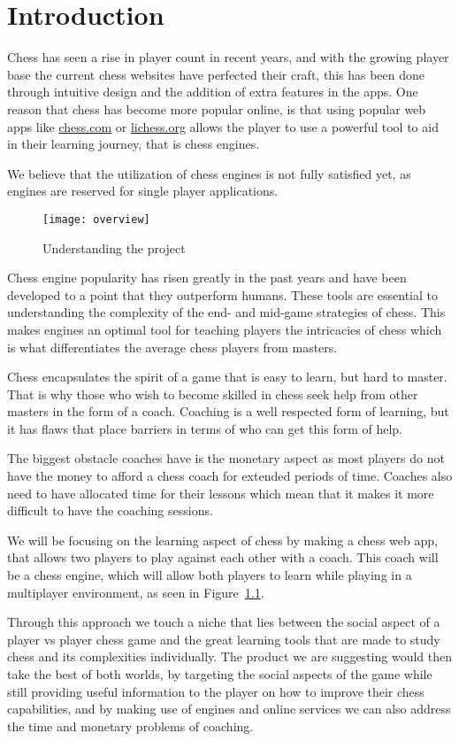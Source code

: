 \chapter{Introduction}\label{ch:introduction}

Chess has seen a rise in player count in recent years, and with the growing player base the current chess websites have
perfected their craft, this has been done through intuitive design and the addition of extra features in the apps.
One reason that chess has become more popular online, is that using popular web apps like \url{chess.com} or
\url{lichess.org} allows the player to use a powerful tool to aid in their learning journey, that is chess engines.

We believe that the utilization of chess engines is not fully satisfied yet, as engines are reserved for single player
applications.

\begin{figure}[htb]
    \centering
    \texttt{[image: overview]}
    \caption{Understanding the project}\label{fig:project-overview}
\end{figure}

Chess engine popularity has risen greatly in the past years and have been developed to a point that they
outperform humans.
These tools are essential to understanding the complexity of the end- and mid-game strategies of chess.
This makes engines an optimal tool for teaching players the intricacies of chess which is what
differentiates the average chess players from masters.


Chess encapsulates the spirit of a game that is easy to learn, but hard to master.
That is why those who wish to become skilled in chess seek help from other masters in the form of a coach.
Coaching is a well respected form of learning, but it has flaws that place barriers in terms of who can get this form of
help.

The biggest obstacle coaches have is the monetary aspect as most players do not have the money to afford a chess coach
for extended periods of time.
Coaches also need to have allocated time for their lessons which mean that it makes it more difficult to have the
coaching sessions.

We will be focusing on the learning aspect of chess by making a chess web app, that allows two players to play against
each other with a coach.
This coach will be a chess engine, which will allow both players to learn while playing in a multiplayer environment, as
seen in Figure~\ref{fig:project-overview}.



Through this approach we touch a niche that lies between the social aspect of a player vs player chess game and the
great learning tools that are made to study chess and its complexities individually.
The product we are suggesting would then take the best of both worlds, by targeting the social aspects of the game while
still providing useful information to the player on how to improve their chess capabilities, and by making use of
engines and online services we can also address the time and monetary problems of coaching.
